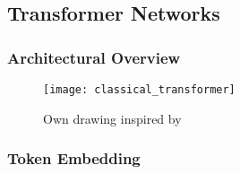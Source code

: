 




\subsection{Transformer Networks}\label{sec:transformer-networks}

\subsubsection{Architectural Overview}\label{sec:architectural-overview}

\begin{landscape}
  \begin{figure}
    \begin{center}
      \texttt{[image: classical\_transformer]}
    \end{center}
    \caption{Own drawing inspired by \textcite{daiTransformerXLAttentiveLanguage2019}}
  \end{figure}
\end{landscape}

\subsubsection{Token Embedding}\label{sec:token-embeddings}

